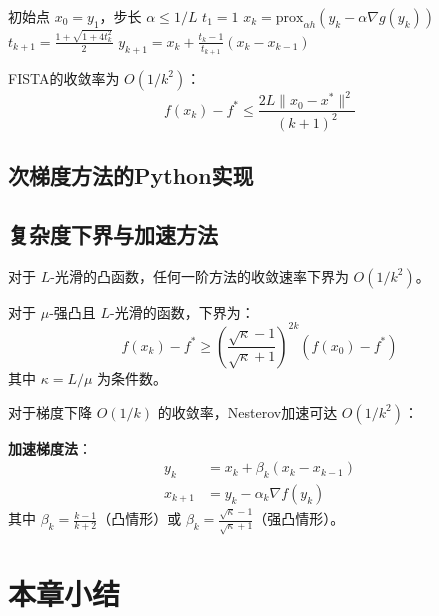 \begin{algorithm}[H]
\caption{FISTA}
\begin{algorithmic}[1]
\Require 初始点 $x_0 = y_1$，步长 $\alpha \leq 1/L$
\State $t_1 = 1$
    \State $x_k = \text{prox}_{\alpha h}(y_k - \alpha \nabla g(y_k))$
    \State $t_{k+1} = \frac{1 + \sqrt{1 + 4t_k^2}}{2}$
    \State $y_{k+1} = x_k + \frac{t_k - 1}{t_{k+1}}(x_k - x_{k-1})$
\EndFor
\end{algorithmic}
\end{algorithm}

\begin{theorem}[FISTA收敛率]
FISTA的收敛率为 $O(1/k^2)$：
\[
f(x_k) - f^* \leq \frac{2L\|x_0 - x^*\|^2}{(k+1)^2}
\]
\end{theorem}

\subsection{次梯度方法的Python实现}\label{sec:subgradient-code}

\subsection{复杂度下界与加速方法}

\begin{theorem}[一阶方法的复杂度下界]
对于 $L$-光滑的凸函数，任何一阶方法的收敛速率下界为 $O(1/k^2)$。

对于 $\mu$-强凸且 $L$-光滑的函数，下界为：
\[
f(x_k) - f^* \geq \left(\frac{\sqrt{\kappa} - 1}{\sqrt{\kappa} + 1}\right)^{2k} (f(x_0) - f^*)
\]
其中 $\kappa = L/\mu$ 为条件数。
\end{theorem}

\begin{notebox}[Nesterov加速梯度法]
对于梯度下降 $O(1/k)$ 的收敛率，Nesterov加速可达 $O(1/k^2)$：

\textbf{加速梯度法}：
\begin{align*}
y_k &= x_k + \beta_k(x_k - x_{k-1}) \\
x_{k+1} &= y_k - \alpha_k \nabla f(y_k)
\end{align*}
其中 $\beta_k = \frac{k-1}{k+2}$（凸情形）或 $\beta_k = \frac{\sqrt{\kappa} - 1}{\sqrt{\kappa} + 1}$（强凸情形）。
\end{notebox}

\section{本章小结}\label{sec:ch5-summary}

